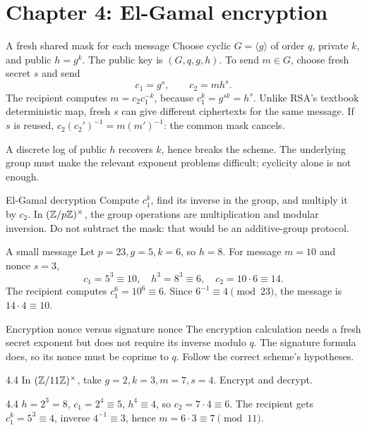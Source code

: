 \documentclass[11pt,a4paper]{article}
\begin{document}
\section{Chapter 4: El-Gamal encryption}
\begin{concept}{A fresh shared mask for each message}
Choose cyclic \(G=\langle g\rangle\) of order \(q\), private \(k\), and public \(h=g^k\). The public key is \((G,q,g,h)\). To send \(m\in G\), choose fresh secret \(s\) and send
\[c_1=g^s,\qquad c_2=mh^s.\]
The recipient computes \(m=c_2c_1^{-k}\), because \(c_1^k=g^{sk}=h^s\). Unlike RSA's textbook deterministic map, fresh \(s\) can give different ciphertexts for the same message. If \(s\) is reused, \(c_2(c_2')^{-1}=m(m')^{-1}\): the common mask cancels.

A discrete log of public \(h\) recovers \(k\), hence breaks the scheme. The underlying group must make the relevant exponent problems difficult; cyclicity alone is not enough.
\end{concept}
\begin{method}{El-Gamal decryption}
Compute \(c_1^k\), find its inverse in the group, and multiply it by \(c_2\). In \((\mathbb Z/p\mathbb Z)^\times\), the group operations are multiplication and modular inversion. Do not subtract the mask: that would be an additive-group protocol.
\end{method}
\begin{example}{A small message}
Let \(p=23,g=5,k=6\), so \(h=8\). For message \(m=10\) and nonce \(s=3\),
\[c_1=5^3\equiv10,\quad h^3=8^3\equiv6,\quad c_2=10\cdot6\equiv14.\]
The recipient computes \(c_1^6=10^6\equiv6\). Since \(6^{-1}\equiv4\pmod{23}\), the message is \(14\cdot4\equiv10\).
\end{example}
\begin{tip}{Encryption nonce versus signature nonce}
The encryption calculation needs a fresh secret exponent but does not require its inverse modulo \(q\). The signature formula does, so its nonce must be coprime to \(q\). Follow the correct scheme's hypotheses.
\end{tip}
\begin{question}{4.4}
In \((\mathbb Z/11\mathbb Z)^\times\), take \(g=2,k=3,m=7,s=4\). Encrypt and decrypt.
\end{question}
\begin{answer}{4.4}
\(h=2^3=8\), \(c_1=2^4\equiv5\), \(h^4\equiv4\), so \(c_2=7\cdot4\equiv6\). The recipient gets \(c_1^k=5^3\equiv4\), inverse \(4^{-1}\equiv3\), hence \(m=6\cdot3\equiv7\pmod{11}\).
\end{answer}
\end{document}

